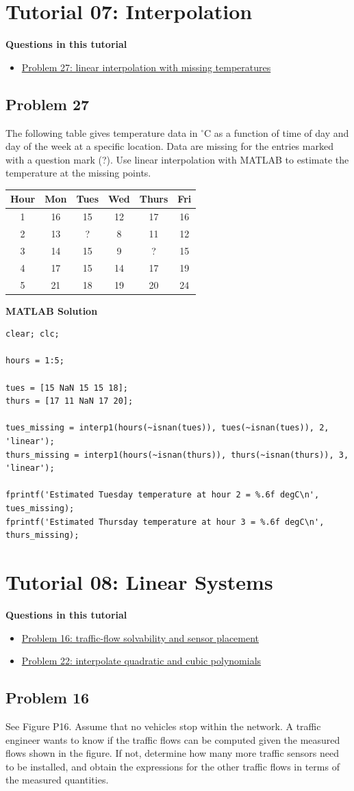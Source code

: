 \documentclass[12pt]{article}
\newcommand{\tutorialsection}[2]{%
    \clearpage
    \phantomsection
    \hypertarget{#1}{}%
    \section*{#2}
}
\newcommand{\questiontitle}[2]{%
    \phantomsection
    \hypertarget{#1}{}%
    \subsection*{#2}
}
\newcommand{\solutiontitle}{\noindent\textbf{MATLAB Solution}}
\newcommand{\minitoc}[1]{%
    \noindent\textbf{Questions in this tutorial}
    \begin{itemize}[leftmargin=1.5em, itemsep=0.2em]
        #1
    \end{itemize}
}
\begin{document}
\tutorialsection{tut7}{Tutorial 07: Interpolation}
\minitoc{
    \item \hyperlink{tut7-q27}{Problem 27: linear interpolation with missing temperatures}
}

\questiontitle{tut7-q27}{Problem 27}
The following table gives temperature data in $^\circ$C as a function of time of day and day of the week at a specific location. Data are missing for the entries marked with a question mark (?). Use linear interpolation with MATLAB to estimate the temperature at the missing points.

\begin{center}
\begin{tabular}{cccccc}
\toprule
Hour & Mon & Tues & Wed & Thurs & Fri \\
\midrule
1 & 16 & 15 & 12 & 17 & 16 \\
2 & 13 & ? & 8 & 11 & 12 \\
3 & 14 & 15 & 9 & ? & 15 \\
4 & 17 & 15 & 14 & 17 & 19 \\
5 & 21 & 18 & 19 & 20 & 24 \\
\bottomrule
\end{tabular}
\end{center}

\solutiontitle
\begin{lstlisting}
clear; clc;

hours = 1:5;

tues = [15 NaN 15 15 18];
thurs = [17 11 NaN 17 20];

tues_missing = interp1(hours(~isnan(tues)), tues(~isnan(tues)), 2, 'linear');
thurs_missing = interp1(hours(~isnan(thurs)), thurs(~isnan(thurs)), 3, 'linear');

fprintf('Estimated Tuesday temperature at hour 2 = %.6f degC\n', tues_missing);
fprintf('Estimated Thursday temperature at hour 3 = %.6f degC\n', thurs_missing);
\end{lstlisting}

\tutorialsection{tut8}{Tutorial 08: Linear Systems}
\minitoc{
    \item \hyperlink{tut8-q16}{Problem 16: traffic-flow solvability and sensor placement}
    \item \hyperlink{tut8-q22}{Problem 22: interpolate quadratic and cubic polynomials}
}

\questiontitle{tut8-q16}{Problem 16}
See Figure P16. Assume that no vehicles stop within the network. A traffic engineer wants to know if the traffic flows can be computed given the measured flows shown in the figure. If not, determine how many more traffic sensors need to be installed, and obtain the expressions for the other traffic flows in terms of the measured quantities.
\end{document}
